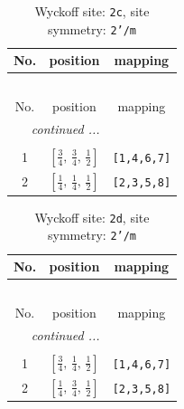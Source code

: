 \documentclass[fleqn,8pt]{jsarticle}
\begin{document}
\renewcommand{\arraystretch}{1.2}
\begin{longtable}{ccc}
\caption{Wyckoff site: {\tt 2c}, site symmetry: {\tt 2'/m}}
 \\
 \hline \hline
No. & position & mapping \\ \hline \endfirsthead

\multicolumn{2}{l}{\tablename\ \thetable{}} \\
 \hline \hline
No. & position & mapping \\ \hline \endhead

 \hline \hline
\multicolumn{2}{r}{\footnotesize\it continued ...} \\ \endfoot

 \hline \hline
\multicolumn{2}{r}{} \\ \endlastfoot

1 & $\left[ \frac{3}{4},\, \frac{3}{4},\, \frac{1}{2} \right]$ & {\tt [1,4,6,7]} \\ \hline
2 & $\left[ \frac{1}{4},\, \frac{1}{4},\, \frac{1}{2} \right]$ & {\tt [2,3,5,8]} \\
\end{longtable}
\renewcommand{\arraystretch}{1.2}
\begin{longtable}{ccc}
\caption{Wyckoff site: {\tt 2d}, site symmetry: {\tt 2'/m}}
 \\
 \hline \hline
No. & position & mapping \\ \hline \endfirsthead

\multicolumn{2}{l}{\tablename\ \thetable{}} \\
 \hline \hline
No. & position & mapping \\ \hline \endhead

 \hline \hline
\multicolumn{2}{r}{\footnotesize\it continued ...} \\ \endfoot

 \hline \hline
\multicolumn{2}{r}{} \\ \endlastfoot

1 & $\left[ \frac{3}{4},\, \frac{1}{4},\, \frac{1}{2} \right]$ & {\tt [1,4,6,7]} \\ \hline
2 & $\left[ \frac{1}{4},\, \frac{3}{4},\, \frac{1}{2} \right]$ & {\tt [2,3,5,8]} \\
\end{longtable}
\renewcommand{\arraystretch}{1.2}
\end{document}
